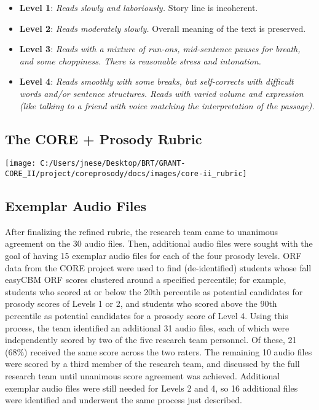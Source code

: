 \documentclass[
]{article}
\providecommand{\tightlist}{%
  \setlength{\itemsep}{0pt}\setlength{\parskip}{0pt}}
\begin{document}
\begin{itemize}
\tightlist
\item
  \textbf{Level 1}: \emph{Reads slowly and laboriously.} Story line is
  incoherent.
\item
  \textbf{Level 2}: \emph{Reads moderately slowly.} Overall meaning of
  the text is preserved.
\item
  \textbf{Level 3}: \emph{Reads with a mixture of run-ons, mid-sentence
  pauses for breath, and some choppiness. There is reasonable stress and
  intonation.}
\item
  \textbf{Level 4}: \emph{Reads smoothly with some breaks, but
  self-corrects with difficult words and/or sentence structures. Reads
  with varied volume and expression (like talking to a friend with voice
  matching the interpretation of the passage).}
\end{itemize}

\hypertarget{the-core-prosody-rubric}{%
\subsection{The CORE + Prosody Rubric}\label{the-core-prosody-rubric}}

\texttt{[image: C:/Users/jnese/Desktop/BRT/GRANT-CORE\_II/project/coreprosody/docs/images/core-ii\_rubric]}

\hypertarget{exemplar-audio-files}{%
\subsection{Exemplar Audio Files}\label{exemplar-audio-files}}

After finalizing the refined rubric, the research team came to unanimous
agreement on the 30 audio files. Then, additional audio files were
sought with the goal of having 15 exemplar audio files for each of the
four prosody levels. ORF data from the CORE project were used to find
(de-identified) students whose fall easyCBM ORF scores clustered around
a specified percentile; for example, students who scored at or below the
20th percentile as potential candidates for prosody scores of Levels 1
or 2, and students who scored above the 90th percentile as potential
candidates for a prosody score of Level 4. Using this process, the team
identified an additional 31 audio files, each of which were
independently scored by two of the five research team personnel. Of
these, 21 (68\%) received the same score across the two raters. The
remaining 10 audio files were scored by a third member of the research
team, and discussed by the full research team until unanimous score
agreement was achieved. Additional exemplar audio files were still
needed for Levels 2 and 4, so 16 additional files were identified and
underwent the same process just described.
\end{document}
